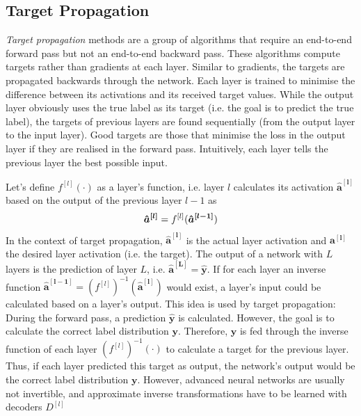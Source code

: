 \subsection{Target Propagation}
\emph{Target propagation} methods are a group of algorithms that require an end-to-end forward pass but not an end-to-end backward pass.
These algorithms compute targets rather than gradients at each layer.
Similar to gradients, the targets are propagated backwards through the network.
Each layer is trained to minimise the difference between its activations and its received target values.
While the output layer obviously uses the true label as its target (i.e. the goal is to predict the true label), the targets of previous layers are found sequentially (from the output layer to the input layer).
Good targets are those that minimise the loss in the output layer if they are realised in the forward pass.
Intuitively, each layer tells the previous layer the best possible input.

Let's define $f^{[l]}(\cdot)$ as a layer's function, i.e. layer $l$ calculates its activation $\boldsymbol{\hat{a}^{[l]}}$ based on the output of the previous layer $l-1$ as
%
\begin{align}\eqlbl{tp0}
	\boldsymbol{\hat{a}^{[l]}} = f^{[l]}(\boldsymbol{\hat{a}^{[l-1]}})
\end{align}
%
In the context of target propagation, $\boldsymbol{\hat{a}^{[l]}}$ is the actual layer activation and $\boldsymbol{a^{[l]}}$ the desired layer activation (i.e. the target).
The output of a network with $L$ layers is the prediction of layer $L$, i.e. $\boldsymbol{\hat{a}^{[L]}} = \boldsymbol{\hat{y}}$. If for each layer an inverse function $\boldsymbol{\hat{a}^{[l-1]}} = (f^{[l]})^{-1}(\boldsymbol{\hat{a}^{[l]}})$ would exist, a layer's input could be calculated based on a layer's output. 
This idea is used by target propagation: During the forward pass, a prediction $\boldsymbol{\hat{y}}$ is calculated. However, the goal is to calculate the correct label distribution $\boldsymbol{y}$. Therefore, $\boldsymbol{y}$ is fed through the inverse function of each layer $(f^{[l]})^{-1}(\cdot)$ to calculate a target for the previous layer.
Thus, if each layer predicted this target as output, the network's output would be the correct label distribution $\boldsymbol{y}$.
However, advanced neural networks are usually not invertible, and approximate inverse transformations have to be learned with decoders $D^{[l]}$

